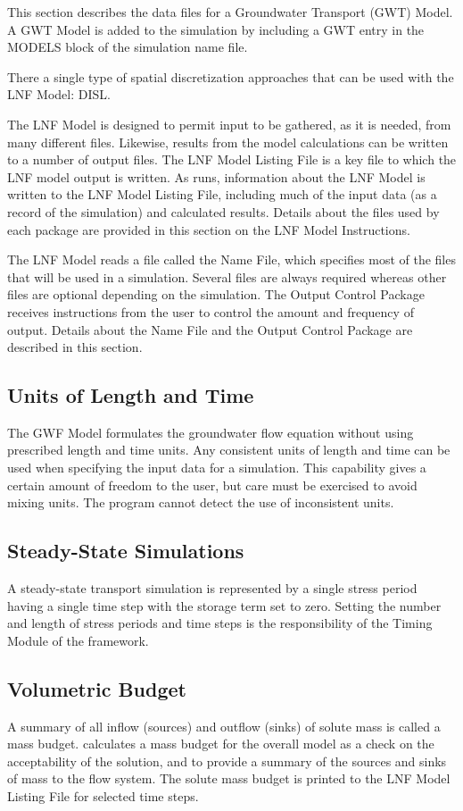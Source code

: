 This section describes the data files for a \mf Groundwater Transport (GWT) Model.  A GWT Model is added to the simulation by including a GWT entry in the MODELS block of the simulation name file.

There a single type of spatial discretization approaches that can be used with the LNF Model: DISL.

The LNF Model is designed to permit input to be gathered, as it is needed, from many different files.  Likewise, results from the model calculations can be written to a number of output files. The LNF Model Listing File is a key file to which the LNF model output is written.  As \mf runs, information about the LNF Model is written to the LNF Model Listing File, including much of the input data (as a record of the simulation) and calculated results.  Details about the files used by each package are provided in this section on the LNF Model Instructions.

The LNF Model reads a file called the Name File, which specifies most of the files that will be used in a simulation. Several files are always required whereas other files are optional depending on the simulation. The Output Control Package receives instructions from the user to control the amount and frequency of output.  Details about the Name File and the Output Control Package are described in this section.


\subsection{Units of Length and Time}
The GWF Model formulates the groundwater flow equation without using prescribed length and time units. Any consistent units of length and time can be used when specifying the input data for a simulation. This capability gives a certain amount of freedom to the user, but care must be exercised to avoid mixing units.  The program cannot detect the use of inconsistent units.

\subsection{Steady-State Simulations}
A steady-state transport simulation is represented by a single stress period having a single time step with the storage term set to zero. Setting the number and length of stress periods and time steps is the responsibility of the Timing Module of the \mf framework.

\subsection{Volumetric Budget}
A summary of all inflow (sources) and outflow (sinks) of solute mass is called a mass budget.  \mf calculates a mass budget for the overall model as a check on the acceptability of the solution, and to provide a summary of the sources and sinks of mass to the flow system.  The solute mass budget is printed to the LNF Model Listing File for selected time steps.

